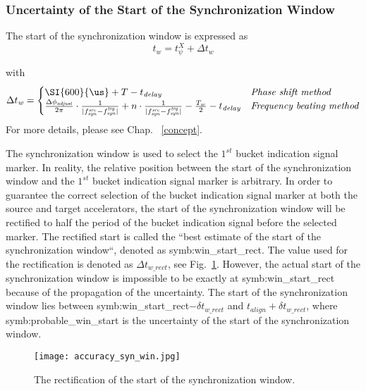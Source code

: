 \subsubsection{Uncertainty of the Start of the Synchronization Window}
\label{cal_start}
The start of the synchronization window is expressed as 
\begin{equation}
t_\mathit{w}=t_\psi^\mathit{X}+\Delta t_\mathit{w}\label{syn_win_start2}
\end{equation}

with 
\begin{eqnarray}
\Delta t_\mathit{w}=
\begin{cases}
\SI{600}{\us}+T-t_\mathit{delay}\ &\textit{Phase shift method}\cr
\frac{\Delta \phi_\mathit{adjust}}{2\pi}\cdot\frac{1}{|f_{\mathit{syn}}^\mathit{src}-f_{\mathit{syn}}^\mathit{trg}|}+n\cdot \frac{1}{|f_{\mathit{syn}}^\mathit{src}-f_{\mathit{syn}}^\mathit{trg}|}-\frac{T_w}{2}-t_\mathit{delay} & \textit{Frequency beating method}\cr
\end{cases}
\end{eqnarray}
For more details, please see Chap. ~\ref{concept}.

The synchronization window is used to select the $1^\mathit{st}$ bucket indication signal marker. In reality, the relative position between the start of the synchronization window and the $1^\mathit{st}$ bucket indication signal marker is arbitrary. In order to guarantee the correct selection of the bucket indication signal marker at both the source and target accelerators, the start of the synchronization window will be rectified to half the period of the bucket indication signal before the selected marker. The rectified start is called the ``best estimate of the start of the synchronization window``, denoted as \gls{symb:win_start_rect}. The value used for the rectification is denoted as $\Delta t_\mathit{w\_rect}$, see Fig.~\ref{accuracy_syn_win}. However, the actual start of the synchronization window is impossible to be exactly at \gls{symb:win_start_rect} because of the propagation of the uncertainty. The start of the synchronization window lies between \gls{symb:win_start_rect}$-\delta t_\mathit{w\_rect}$ and $t_\mathit{align}+\delta t_\mathit{w\_rect}$, where \gls{symb:probable_win_start} is the uncertainty of the start of the synchronization window. 
\begin{figure}[!htb]
   \centering   
   \texttt{[image: accuracy\_syn\_win.jpg]}
   \caption{The rectification of the start of the synchronization window.}
   \label{accuracy_syn_win}
\end{figure}

